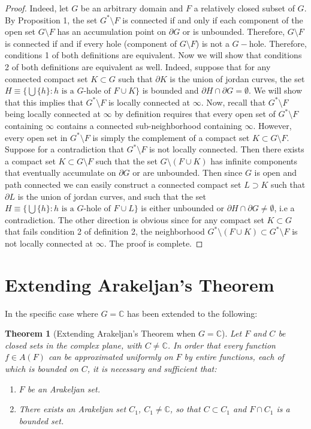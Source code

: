 \documentclass[12pt]{article}
\newtheorem{thm}{Theorem}
\begin{document}
\begin{proof}
Indeed, let $G$ be an arbitrary domain and $F$ a relatively closed subset of $G$.
By {Proposition 1}, the set $G^*\setminus F$ is connected if and only if each component of the open set $G\setminus F$ has an accumulation point on $\partial G$ or is unbounded. Therefore, $G\setminus F$ is connected if and if every hole (component of $G\setminus F$) is not a $G-$hole. Therefore, conditions 1 of both definitions are equivalent.
Now we will show that conditions 2 of both definitions are equivalent as well.
Indeed, suppose that for any connected compact set $K\subset G$ such that $\partial K$ is the union of jordan curves, the set $H\equiv\lbrace \bigcup \lbrace h\rbrace :h \text{ is a $G$-hole of }F\cup K\rbrace$ is bounded and $\partial H\cap \partial G=\emptyset$. We will show that this implies that $G^*\setminus F$ is locally connected at $\infty$.
Now, recall that $G^*\setminus F$ being locally connected at $\infty$ by definition requires that every open set of $G^*\setminus F$ containing $\infty$ contains a connected sub-neighborhood containing $\infty$. However, every open set in $G^*\setminus F$ is simply the 
complement of a compact set $K\subset G\setminus F$. Suppose for a contradiction that $G^*\setminus F$ is not locally connected. Then there exists a compact set $K\subset G\setminus F$ such that the set  $G\setminus (F\cup K)$ has infinite components that eventually accumulate on $\partial G$ or are unbounded. Then since $G$ is open and path connected we can easily construct a connected compact set $L\supset K$ such that $\partial L$ is the union of jordan curves, and such that the set $H\equiv\lbrace \bigcup \lbrace h\rbrace :h \text{ is a $G$-hole of }F\cup L\rbrace$ is either unbounded or $\partial H\cap\partial G\neq\emptyset$, i.e a contradiction. The other direction is obvious since for any compact set $K\subset G$ that fails condition 2 of definition 2, the neighborhood $G^*\setminus(F\cup K)\subset G^*\setminus F$ is not locally connected at $\infty$. The proof is complete.
\end{proof}
\pagebreak

 \section*{Extending Arakeljan's Theorem}
 In \cite{RU} the specific case where $G=\mathbb{C}$ has been extended to the following:

\begin{thm}[Extending Arakeljan's Theorem when $G=\mathbb{C}$]
Let $F$ and $C$ be closed sets in the complex plane, with $C\not=\mathbb{C}$. In order that every function $f\in A(F)$ can be approximated uniformly on $F$ by entire functions, each of which is bounded on $C$, it is necessary and sufficient that: \begin{enumerate}
\item $F$ be an Arakeljan set.
\item There exists an Arakeljan set $C_1$, $C_1\not=\mathbb{C}$, so that $C\subset C_1$ and $F\cap C_1$ is a bounded set.
\end{enumerate}
\end{thm}
\end{document}

